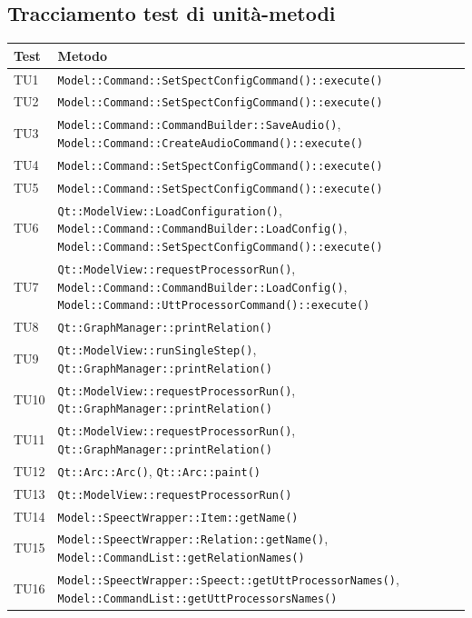 \documentclass[openany,12pt,a4paper]{report}
\begin{document}
\subsection{Tracciamento test di unità-metodi}

\begin{longtable}[c]{| p{2.5cm} |p{11cm}|}
	\hline
	\textbf{Test} & \textbf{Metodo}\\
	\hline
	\endhead
	TU1&
	\verb|Model::Command::SetSpectConfigCommand()::execute()|
	\\[1em]	
	\hline
	TU2&
	\verb|Model::Command::SetSpectConfigCommand()::execute()|
	\\[1em]	
	\hline	
	TU3&
	\verb|Model::Command::CommandBuilder::SaveAudio()|, \verb|Model::Command::CreateAudioCommand()::execute()|
	\\[1em]	
	\hline	
	TU4&
	\verb|Model::Command::SetSpectConfigCommand()::execute()|
	\\[1em]	
	\hline	
	TU5&
	\verb|Model::Command::SetSpectConfigCommand()::execute()|
	\\[1em]	
	\hline	
	TU6&
	\verb|Qt::ModelView::LoadConfiguration()|, \verb|Model::Command::CommandBuilder::LoadConfig()|, \verb|Model::Command::SetSpectConfigCommand()::execute()|
	\\[1em]
	\hline	
	TU7&
	\verb|Qt::ModelView::requestProcessorRun()|,
	\verb|Model::Command::CommandBuilder::LoadConfig()|,
	\verb|Model::Command::UttProcessorCommand()::execute()|
	\\[1em]
	\hline	
	TU8&
	\verb|Qt::GraphManager::printRelation()|
	\\[1em]
	\hline	
	TU9&
	\verb|Qt::ModelView::runSingleStep()|,
	\verb|Qt::GraphManager::printRelation()|
	\\[1em]
	\hline	
	TU10&
	\verb|Qt::ModelView::requestProcessorRun()|,
	\verb|Qt::GraphManager::printRelation()|
	\\[1em]
	\hline	
	TU11&
	\verb|Qt::ModelView::requestProcessorRun()|,
	\verb|Qt::GraphManager::printRelation()|
	\\[1em]
	\hline	
	TU12&
	\verb|Qt::Arc::Arc()|,
	\verb|Qt::Arc::paint()|
	\\[1em]
	\hline
	TU13&
	\verb|Qt::ModelView::requestProcessorRun()|
	\\[1em]
	\hline
	TU14&
	\verb|Model::SpeectWrapper::Item::getName()|
	\\[1em]
	\hline	
	TU15&
	\verb|Model::SpeectWrapper::Relation::getName()|, \verb|Model::CommandList::getRelationNames()|
	\\[1em]
	\hline
	TU16&
	\verb|Model::SpeectWrapper::Speect::getUttProcessorNames()|, \verb|Model::CommandList::getUttProcessorsNames()|

\end{longtable}
\end{document}
